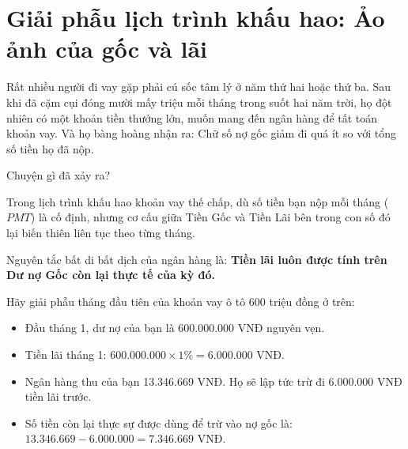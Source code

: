 \documentclass[14pt, a4paper, oneside]{extreport}
\begin{document}
\section{Giải phẫu lịch trình khấu hao: Ảo ảnh của gốc và lãi}

Rất nhiều người đi vay gặp phải cú sốc tâm lý ở năm thứ hai hoặc thứ ba. Sau khi đã cặm cụi đóng mười mấy triệu mỗi tháng trong suốt hai năm trời, họ đột nhiên có một khoản tiền thưởng lớn, muốn mang đến ngân hàng để tất toán khoản vay. Và họ bàng hoàng nhận ra: Chữ số nợ gốc giảm đi quá ít so với tổng số tiền họ đã nộp. 

Chuyện gì đã xảy ra?

Trong lịch trình khấu hao khoản vay thế chấp, dù số tiền bạn nộp mỗi tháng ($PMT$) là cố định, nhưng cơ cấu giữa Tiền Gốc và Tiền Lãi bên trong con số đó lại biến thiên liên tục theo từng tháng. 

Nguyên tắc bất di bất dịch của ngân hàng là: \textbf{Tiền lãi luôn được tính trên Dư nợ Gốc còn lại thực tế của kỳ đó.}

Hãy giải phẫu tháng đầu tiên của khoản vay ô tô 600 triệu đồng ở trên:
\begin{itemize}
    \item Đầu tháng 1, dư nợ của bạn là 600.000.000 VNĐ nguyên vẹn.
    \item Tiền lãi tháng 1: $600.000.000 \times 1\% = 6.000.000 \text{ VNĐ}$.
    \item Ngân hàng thu của bạn 13.346.669 VNĐ. Họ sẽ lập tức trừ đi 6.000.000 VNĐ tiền lãi trước. 
    \item Số tiền còn lại thực sự được dùng để trừ vào nợ gốc là: $13.346.669 - 6.000.000 = 7.346.669 \text{ VNĐ}$.
\end{itemize}
\end{document}
